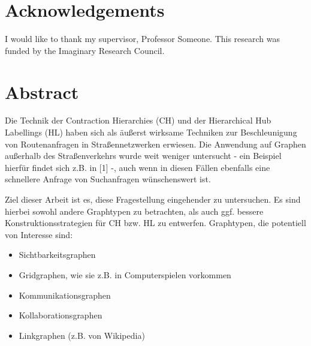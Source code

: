 \tableofcontents
\listoffigures
\listoftables

\chapter{Acknowledgements}

I would like to thank my supervisor, Professor Someone. This
research was funded by the Imaginary Research Council.

\chapter{Abstract}
Die Technik der Contraction Hierarchies (CH) und der Hierarchical Hub Labellings (HL) haben sich als äußerst wirksame Techniken zur Beschleunigung von Routenanfragen in Straßennetzwerken erwiesen. Die Anwendung auf Graphen außerhalb des Straßenverkehrs wurde weit weniger untersucht - ein Beispiel hierfür findet sich z.B. in [1] -, auch wenn in diesen Fällen ebenfalls eine schnellere Anfrage von Suchanfragen wünschenswert ist.

Ziel dieser Arbeit ist es, diese Fragestellung eingehender zu untersuchen. Es sind hierbei sowohl andere Graphtypen zu betrachten, als auch ggf. bessere Konstruktionsstrategien für CH bzw. HL zu entwerfen. Graphtypen, die potentiell von Interesse sind:

\begin{itemize}
      \item
            Sichtbarkeitsgraphen
      \item
            Gridgraphen, wie sie z.B. in Computerspielen vorkommen
      \item
            Kommunikationsgraphen
      \item
            Kollaborationsgraphen
      \item
            Linkgraphen (z.B. von Wikipedia)
\end{itemize}